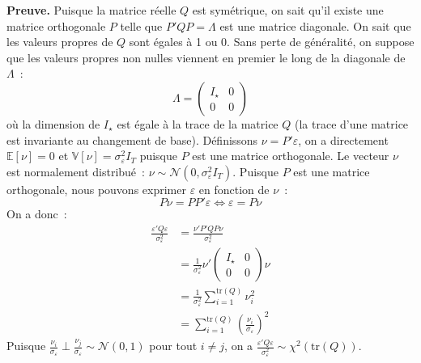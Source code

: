 \documentclass[10pt]{beamer}
\theoremstyle{plain}
\begin{document}
\begin{notes}
\begin{itemize}
       \textbf{Preuve.} Puisque la matrice réelle $Q$ est symétrique,
       on sait qu'il existe une matrice orthogonale $P$ telle
       que $P'QP = \Lambda$ est une matrice diagonale. On sait que les
       valeurs propres de $Q$ sont égales à 1 ou 0. Sans perte de
       généralité, on suppose que les valeurs propres non nulles
       viennent en premier le long de la diagonale de $\Lambda$~:
       \[
         \Lambda =
         \begin{pmatrix}
           I_{\star} & 0 \\
           0 & 0
         \end{pmatrix}
       \]
       où la dimension de $I_{\star}$ est égale à la trace de la
       matrice $Q$ (la trace d'une matrice est invariante au
       changement de base). Définissons $\nu = P'\varepsilon$, on a
       directement $\mathbb E[\nu] = 0$
       et $\mathbb V[\nu] = \sigma_{\varepsilon}^2I_T$ puisque $P$ est
       une matrice orthogonale. Le vecteur $\nu$ est normalement
       distribué~:
       $\nu \sim \mathcal N \left( 0, \sigma_{\varepsilon}^2I_T \right)$. Puisque
       $P$ est une matrice orthogonale, nous pouvons
       exprimer $\varepsilon$ en fonction de $\nu$~:
       \[
         P\nu = PP'\varepsilon \Leftrightarrow \varepsilon = P\nu
       \]
       On a donc~:
       \[
         \begin{split}
           \frac{\varepsilon' Q \varepsilon}{\sigma_{\varepsilon}^2} &= \frac{\nu'P'Q P \nu}{\sigma_{\varepsilon}^2}\\
                                                                     &= \frac{1}{\sigma_{\varepsilon}^2}\nu'
                                                                       \begin{pmatrix}
                                                                         I_{\star} & 0\\
                                                                         0 & 0
                                                                       \end{pmatrix} \nu \\
                                                                     &= \frac{1}{\sigma_{\varepsilon}^2}\sum_{i=1}^{\mathrm{tr}(Q)}\nu_i^2\\
                                                                     &= \sum_{i=1}^{\mathrm{tr}(Q)}\left( \frac{\nu_i}{\sigma_{\varepsilon}} \right)^2
         \end{split}
       \]
       Puisque $\frac{\nu_i}{\sigma_\varepsilon} \perp \frac{\nu_j}{\sigma_\varepsilon} \sim \mathcal N(0,1)$ pour tout $i\neq j$, on a $\frac{\varepsilon' Q \varepsilon}{\sigma_{\varepsilon}^2}\sim\chi^2\left( \mathrm{tr}(Q) \right)$.\newline


\end{itemize}
\end{notes}
\end{document}
